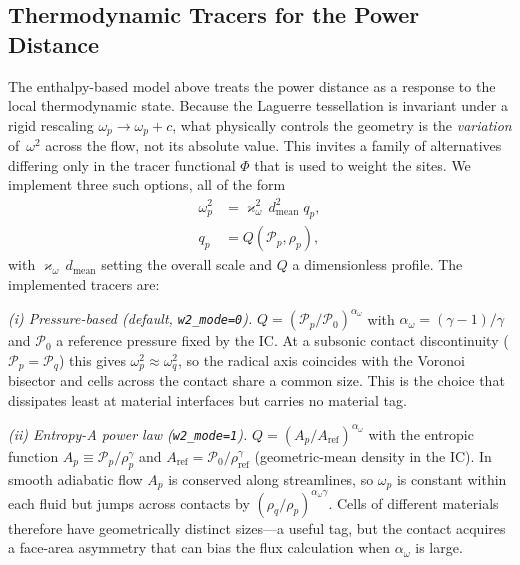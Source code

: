 \documentclass[twocolumn]{aastex63}
\newcommand{\pressure}[0]{\mathcal{P}}
\begin{document}
\subsection{Thermodynamic Tracers for the Power Distance}
\label{sec:w2modes}
The enthalpy-based model above treats the power distance as a response to
the local thermodynamic state. Because the Laguerre tessellation is
invariant under a rigid rescaling $\omega_p\to\omega_p+c$, what physically
controls the geometry is the \emph{variation} of~$\omega^2$ across the
flow, not its absolute value.  This invites a family of alternatives
differing only in the tracer functional $\Phi$ that is used to weight the
sites.  We implement three such options, all of the form
\begin{equation}
  \begin{aligned}
  \omega_p^2 &= \varkappa_\omega^2\, d_\textrm{mean}^2 \; q_p,\\
  q_p &= Q\!\left(\pressure_p,\rho_p\right),
  \end{aligned}
  \label{omega_tracer}
\end{equation}
with $\varkappa_\omega\,d_\textrm{mean}$ setting the overall scale and
$Q$ a dimensionless profile.  The implemented tracers are:

\textit{(i) Pressure-based (default, \texttt{w2\_mode=0}).}
$Q = \left(\pressure_p/\pressure_0\right)^{\alpha_\omega}$ with
$\alpha_\omega=(\gamma-1)/\gamma$ and $\pressure_0$ a reference pressure
fixed by the IC.  At a subsonic contact discontinuity
($\pressure_p=\pressure_q$) this gives $\omega_p^2\approx\omega_q^2$, so
the radical axis coincides with the Voronoi bisector and cells across the
contact share a common size.  This is the choice that dissipates least at
material interfaces but carries no material tag.

\textit{(ii) Entropy-A power law (\texttt{w2\_mode=1}).}
$Q = \left(A_p/A_\textrm{ref}\right)^{\alpha_\omega}$ with the entropic
function $A_p\equiv \pressure_p/\rho_p^{\gamma}$ and
$A_\textrm{ref}=\pressure_0/\rho_\textrm{ref}^{\gamma}$ (geometric-mean
density in the IC).  In smooth adiabatic flow $A_p$ is conserved along
streamlines, so $\omega_p$ is constant within each fluid but jumps across
contacts by $(\rho_q/\rho_p)^{\alpha_\omega\gamma}$.  Cells of different
materials therefore have geometrically distinct sizes---a useful tag,
but the contact acquires a face-area asymmetry that can bias the flux
calculation when $\alpha_\omega$ is large.
\end{document}
